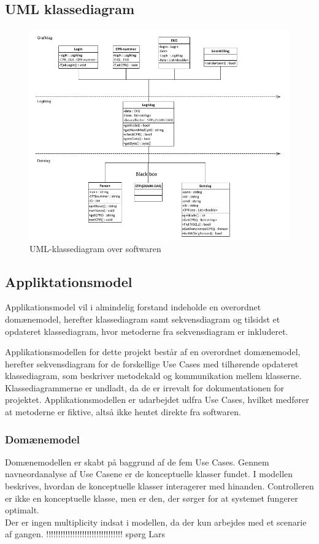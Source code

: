 \subsection{UML klassediagram}

\begin{figure}[H]
	\centering
	\includegraphics[width=1\textwidth]{Figurer/Snip20150430_42}
	\caption{UML-klassediagram over softwaren}
\end{figure}

\subsection{Appliktationsmodel}
Applikationsmodel vil i almindelig forstand indeholde en overordnet domænemodel, herefter klassediagram samt sekvensdiagram og tilsidst et opdateret klassediagram, hvor metoderne fra sekvensdiagram er inkluderet. 

Applikationsmodellen for dette projekt består af en overordnet domænemodel, herefter sekvensdiagram for de forskellige Use Cases med tilhørende opdateret klassediagram, som beskriver metodekald og kommunikation mellem klasserne. Klassediagrammerne er undladt, da de er irrevalt for dokumentationen for projektet. Applikationsmodellen er udarbejdet udfra Use Cases, hvilket medfører at metoderne er fiktive, altså ikke hentet direkte fra softwaren.  

\subsubsection{Domænemodel}
Domænemodellen er skabt på baggrund af de fem Use Cases. Gennem navneordanalyse af Use Casene er de konceptuelle klasser fundet. I modellen beskrives, hvordan de konceptuelle klasser interagerer med hinanden. Controlleren er ikke en konceptuelle klasse, men er den, der sørger for at systemet fungerer optimalt.
\\
Der er ingen multiplicity indsat i modellen, da der kun arbejdes med et scenarie af gangen. !!!!!!!!!!!!!!!!!!!!!!!!!!!!!!!! spørg Lars 

